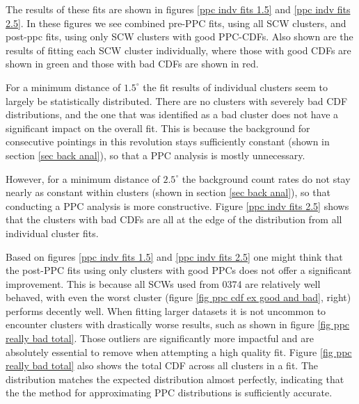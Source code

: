 \documentclass{report}
\begin{document}
The results of these fits are shown in figures \ref{ppc indv fits 1.5} and \ref{ppc indv fits 2.5}. In these figures we see combined pre-PPC fits, using all SCW clusters, and post-ppc fits, using only SCW clusters with good PPC-CDFs. Also shown are the results of fitting each SCW cluster individually, where those with good CDFs are shown in green and those with bad CDFs are shown in red. 

For a minimum distance of $1.5^\circ$ the fit results of individual clusters seem to largely be statistically distributed. There are no clusters with severely bad CDF distributions, and the one that was identified as a bad cluster does not have a significant impact on the overall fit. This is because the background for consecutive pointings in this revolution stays sufficiently constant (shown in section \ref{sec back anal}), so that a PPC analysis is mostly unnecessary.

However, for a minimum distance of $2.5^\circ$ the background count rates do not stay nearly as constant within clusters (shown in section \ref{sec back anal}), so that conducting a PPC analysis is more constructive. Figure \ref{ppc indv fits 2.5} shows that the clusters with bad CDFs are all at the edge of the distribution from all individual cluster fits.

Based on figures \ref{ppc indv fits 1.5} and \ref{ppc indv fits 2.5} one might think that the post-PPC fits using only clusters with good PPCs does not offer a significant improvement. This is because all SCWs used from 0374 are relatively well behaved, with even the worst cluster (figure \ref{fig ppc cdf ex good and bad}, right) performs decently well. When fitting larger datasets it is not uncommon to encounter clusters with drastically worse results, such as shown in figure \ref{fig ppc really bad total}. Those outliers are significantly more impactful and are absolutely essential to remove when attempting a high quality fit. Figure \ref{fig ppc really bad total} also shows the total CDF across all clusters in a fit. The distribution matches the expected distribution almost perfectly, indicating that the the method for approximating PPC distributions is sufficiently accurate. 
\end{document}
